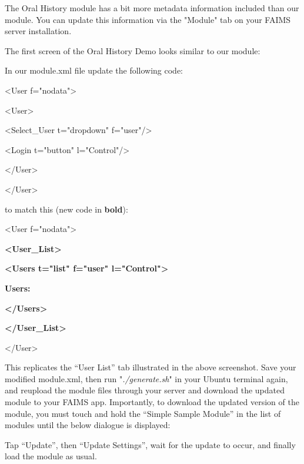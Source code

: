 {}

The Oral History module has a bit more metadata information included than our module. You can update this information via the "Module" tab on your FAIMS server installation.

{}{}

The first screen of the Oral History Demo looks similar to our module:

{}

In our module.xml file update the following code:

<User f="nodata">

<User>

<Select_User t="dropdown" f="user"/>

<Login t="button" l="Control"/>

</User>

</User>

to match this (new code in {\bf bold}):

<User f="nodata">

{\bf <User_List>}

{\bf <Users t="list" f="user" l="Control">}

{\bf Users:}

{\bf </Users>}

{\bf </User_List>}

</User>

This replicates the “User List” tab illustrated in the above screenshot. Save your modified module.xml, then run "{\em ./generate.sh}" in your Ubuntu terminal again, and reupload the module files through your server and download the updated module to your FAIMS app. Importantly, to download the updated version of the module, you must touch and hold the “Simple Sample Module” in the list of modules until the below dialogue is displayed:

{}

Tap “Update”, then “Update Settings”, wait for the update to occur, and finally load the module as usual.

